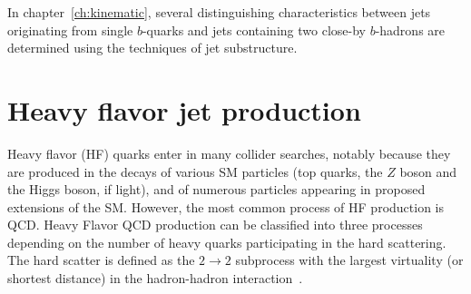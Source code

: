 

In chapter~\ref{ch:kinematic}, several distinguishing characteristics between jets originating from single $b$-quarks and jets containing two close-by  $b$-hadrons are determined using the techniques of jet substructure. 







\section{Heavy flavor jet production}\label{sec:bproduction}

Heavy flavor  (HF) quarks enter in many collider searches, notably because they are produced in the decays of various SM particles (top quarks, the $Z$ boson and the Higgs boson, if light), and of numerous particles appearing in proposed extensions of the SM. However, the most common process of HF production is QCD. Heavy Flavor QCD production can be classified into three processes 
depending on the number of heavy quarks participating in the hard scattering. The hard scatter is defined as the $2 \rightarrow 2$ subprocess with the largest virtuality (or shortest distance) in the hadron-hadron interaction~\cite{Norrbin:2000zc}.



